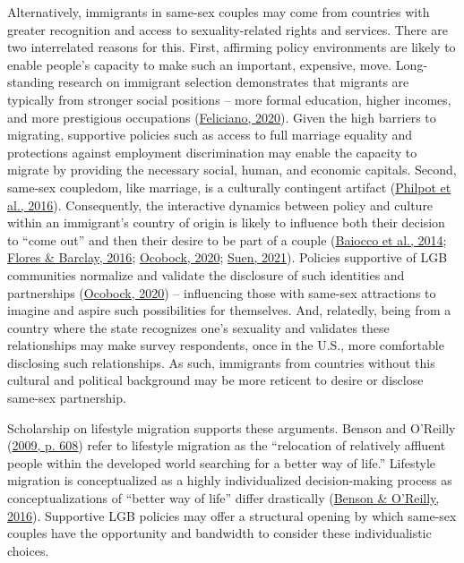 \documentclass[
  12pt,
]{article}
\begin{document}
Alternatively, immigrants in same-sex couples may come from countries with greater recognition and access to sexuality-related rights and services. There are two interrelated reasons for this. First, affirming policy environments are likely to enable people's capacity to make such an important, expensive, move. Long-standing research on immigrant selection demonstrates that migrants are typically from stronger social positions -- more formal education, higher incomes, and more prestigious occupations (\protect\hyperlink{ref-feliciano_2020}{Feliciano, 2020}). Given the high barriers to migrating, supportive policies such as access to full marriage equality and protections against employment discrimination may enable the capacity to migrate by providing the necessary social, human, and economic capitals. Second, same-sex coupledom, like marriage, is a culturally contingent artifact (\protect\hyperlink{ref-philpot_2016_gay}{Philpot et al., 2016}). Consequently, the interactive dynamics between policy and culture within an immigrant's country of origin is likely to influence both their decision to ``come out'' and then their desire to be part of a couple (\protect\hyperlink{ref-baiocco_2014_desire}{Baiocco et al., 2014}; \protect\hyperlink{ref-flores_2016_backlash}{Flores \& Barclay, 2016}; \protect\hyperlink{ref-ocobock_2020_leveraging}{Ocobock, 2020}; \protect\hyperlink{ref-suen_2021_sexual}{Suen, 2021}). Policies supportive of LGB communities normalize and validate the disclosure of such identities and partnerships (\protect\hyperlink{ref-ocobock_2020_leveraging}{Ocobock, 2020}) -- influencing those with same-sex attractions to imagine and aspire such possibilities for themselves. And, relatedly, being from a country where the state recognizes one's sexuality and validates these relationships may make survey respondents, once in the U.S., more comfortable disclosing such relationships. As such, immigrants from countries without this cultural and political background may be more reticent to desire or disclose same-sex partnership.

Scholarship on lifestyle migration supports these arguments. Benson and O'Reilly (\protect\hyperlink{ref-benson_2009}{2009, p. 608}) refer to lifestyle migration as the ``relocation of relatively affluent people within the developed world searching for a better way of life.'' Lifestyle migration is conceptualized as a highly individualized decision-making process as conceptualizations of ``better way of life'' differ drastically (\protect\hyperlink{ref-benson_2016}{Benson \& O'Reilly, 2016}). Supportive LGB policies may offer a structural opening by which same-sex couples have the opportunity and bandwidth to consider these individualistic choices.
\end{document}
